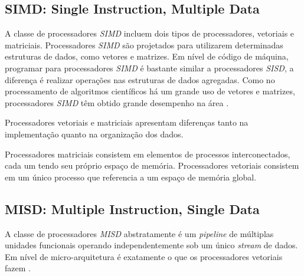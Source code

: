 \subsection{SIMD: Single Instruction, Multiple Data}

A classe de processadores \textit{SIMD} incluem dois tipos de
processadores, vetoriais e matriciais.
Processadores \textit{SIMD} são projetados para utilizarem determinadas
estruturas de dados, como vetores e matrizes. 
Em nível de código de máquina, programar para processadores \textit{SIMD} é 
bastante similar a processadores \textit{SISD}, a diferença é realizar operações
nas estruturas de dados agregadas. Como no processamento de algoritmos 
científicos há um grande uso de vetores e matrizes, processadores \textit{SIMD}
têm obtido grande desempenho na área \cite{eopc}.

Processadores vetoriais e matriciais apresentam diferenças tanto na 
implementação quanto na organização dos dados.

Processadores matriciais consistem em elementos de processos interconectados,
cada um tendo seu próprio espaço de memória. Processadores vetoriais consistem
em um único processo que referencia a um espaço de memória global.





\subsection{MISD: Multiple Instruction, Single Data}

A classe de processadores \textit{MISD} abstratamente é um
\textit{pipeline} de múltiplas unidades funcionais operando independentemente
sob um único \textit{stream} de dados. Em nível de micro-arquitetura é
exatamente o que os processadores vetoriais fazem \cite[2.3]{aipp}.

